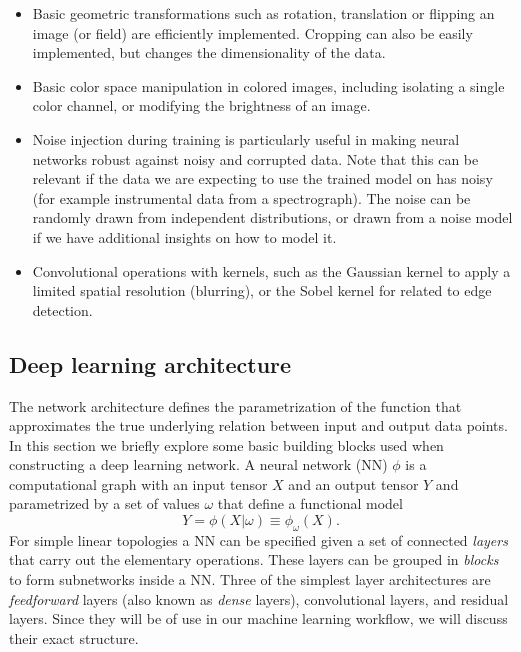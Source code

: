 \begin{itemize}
    \item Basic geometric transformations such as rotation, translation or flipping an image (or field) are efficiently implemented. Cropping can also be easily implemented, but changes the dimensionality of the data.
    \item Basic color space manipulation in colored images, including isolating a single color channel, or modifying the brightness of an image.
    \item Noise injection during training is particularly useful in making neural networks robust against noisy and corrupted data. Note that this can be relevant if the data we are expecting to use the trained model on has noisy (for example instrumental data from a spectrograph). The noise can be randomly drawn from independent distributions, or drawn from a noise model if we have additional insights on how to model it.
    \item Convolutional operations with kernels, such as the Gaussian kernel to apply a limited spatial resolution (blurring), or the Sobel kernel for related to edge detection.
\end{itemize}


\subsection{Deep learning architecture}\label{sec:deep learning archi}
The network architecture defines the parametrization of the function that approximates the true underlying relation between input and output data points. In this section we briefly explore some basic building blocks used when constructing a deep learning network.
A neural network (NN) $\phi$ is a computational graph with an input tensor $X$ and an output tensor $Y$ and parametrized by a set of values $\omega$ that define a functional model
\begin{equation}
    Y=\phi(X|\omega)\equiv \phi_\omega (X).
\end{equation}
For simple linear topologies a NN can be specified given a set of connected \emph{layers} that carry out the elementary operations. These layers can be grouped in \emph{blocks} to form subnetworks inside a NN. Three of the simplest layer architectures are \emph{feedforward} layers (also known as \emph{dense} layers), convolutional layers, and residual layers. Since they will be of use in our machine learning workflow, we will discuss their exact structure.

